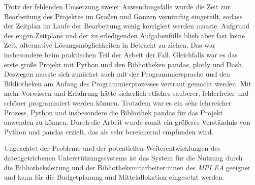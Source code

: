 Trotz der fehlenden Umsetzung zweier Anwendungsfälle wurde die Zeit zur Bearbeitung des Projektes im Großen und Ganzen vernünftig eingeteilt, 
sodass der Zeitplan im Laufe der Bearbeitung wenig korrigiert werden musste. Aufgrund des engen Zeitplans und der zu erledigenden Aufgabenfülle
blieb aber fast keine Zeit, alternative Lösungsmöglichkeiten in Betracht zu ziehen. 
Das war insbesondere beim praktischen Teil der Arbeit der Fall. Gleichfalls war es das erste große Projekt mit Python und den Bibliotheken pandas, plotly und Dash.
Deswegen musste sich zunächst auch mit der Programmiersprache und den Bibliotheken am Anfang des Programmierprozesses vertraut gemacht werden.
Mit mehr Vorwissen und Erfahrung hätte sicherlich etliches sauberer, fehlerfreier und schöner programmiert werden können. 
Trotzdem war es ein sehr lehrreicher Prozess, Python und insbesondere die Bibliothek pandas für das Projekt anwenden zu können. 
Durch die Arbeit wurde somit ein größeres Verständnis von Python und pandas erzielt, das als sehr bereichernd empfunden wird.


Ungeachtet der Probleme und der potentiellen Weiterentwicklungen des datengetriebenen Unterstützungssystems ist das System für die Nutzung durch die Bibliotheksleitung und der Bibliotheksmitarbeiter:innen des \textit{\acrlong{MPI EA}} 
geeignet und kann für die Budgetplanung und Mittelallokation eingesetzt werden.